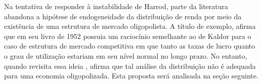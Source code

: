 Na tentativa de responder à instabilidade de Harrod, parte da literatura abandona a hipótese de endogeneidade da distribuição de renda por meio da existência de uma estrutura de mercado oligopolista. A título de exemplo, \textcite{steindl_stagnation_1979} afirma que em seu livro de 1952 \cite{steindl_maturity_1952} possuia um raciocínio semelhante ao de Kaldor para o caso de estrutura de mercado competitiva em que tanto as taxas de lucro quanto o grau de utilização estariam em seu nível normal no longo prazo. No entanto, quando revisita essa ideia \cite{steindl_stagnation_1979}, afirma que tal análise da distribuição não é adequada para uma economia oligopolizada. Esta proposta será analisada na seção seguinte.

\begin{comment}
DESCARTADOS

\begin{equation}
\frac{I}{K} = g = \gamma + \gamma_r r
\end{equation}
Esse raciocínio pode ser traduzido em termos da equação \ref{Sintetica}\footnote{A versão proposta por \textcite{pasinetti_rate_1962} explicita as condições de \textit{stedy state} em que a taxa de juros e lucros precisam ser iguais no longo prazo. \textcite[p.~101]{kurz_post-keynesian_2010} destacam que a função poupança de Kaldor só é possível no longo prazo se a taxa de juros não exceder a taxa de lucros. Além disso, a exclusão da propensão marginal à poupar dos trabalhadores é decorrência do ``Teorema de Pasinetti'' em que a taxa de lucro independe da poupança dos trabalhadores.
}:

\begin{equation}
\label{Cambridge_Parcial}
\gamma + \gamma_r r = \mybox{$g = g_K$} =  f\frac{s_k\cdot u_N}{\overline v}
\end{equation}
Adiante, decompõe-se a taxa de lucro ($r$) nos termos de \textcite{weisskopf_marxian_1979}:
$$
r = \frac{P}{K} = \frac{P}{Y}\frac{Y}{Y_{FC}}\frac{Y_{FC}}{K}
$$
em que $P$ é a massa de lucros e $\omega$ o \textit{wage-share}. Como a relação capital-produto é considerada constante, a taxa de lucro depende simultaneamente do grau de utilização e distribuição de renda:
\begin{equation}
\label{Decomposicao_Lucro}
r = \frac{(1-\omega)\cdot u}{\overline v}  
\end{equation}
Substituindo a equação \ref{Decomposicao_Lucro} na \ref{Cambridge_Parcial}, obtém-se

$$
\gamma + \gamma_r \frac{(1-\omega)\cdot u}{\overline v} = \mybox{$g = g_K$} =  f\frac{s\cdot u}{\overline v}
$$



\end{comment}
